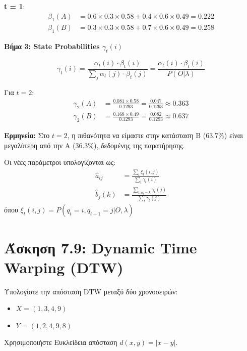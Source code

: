 \textbf{t = 1}:
\begin{align*}
\beta_1(A) &= 0.6 \times 0.3 \times 0.58 + 0.4 \times 0.6 \times 0.49 = 0.222 \\
\beta_1(B) &= 0.3 \times 0.3 \times 0.58 + 0.7 \times 0.6 \times 0.49 = 0.258
\end{align*}

\textbf{Βήμα 3: State Probabilities $\gamma_t(i)$}

$$\gamma_t(i) = \frac{\alpha_t(i) \cdot \beta_t(i)}{\sum_j \alpha_t(j) \cdot \beta_t(j)} = \frac{\alpha_t(i) \cdot \beta_t(i)}{P(O|\lambda)}$$

Για $t = 2$:
\begin{align*}
\gamma_2(A) &= \frac{0.081 \times 0.58}{0.1293} = \frac{0.047}{0.1293} \approx 0.363 \\
\gamma_2(B) &= \frac{0.168 \times 0.49}{0.1293} = \frac{0.082}{0.1293} \approx 0.637
\end{align*}

\textbf{Ερμηνεία:} Στο $t=2$, η πιθανότητα να είμαστε στην κατάσταση B (63.7\%) είναι
μεγαλύτερη από την A (36.3\%), δεδομένης της παρατήρησης.

\begin{warningbox}
Οι νέες παράμετροι υπολογίζονται ως:
\begin{align*}
\hat{a}_{ij} &= \frac{\sum_t \xi_t(i,j)}{\sum_t \gamma_t(i)} \\
\hat{b}_j(k) &= \frac{\sum_{t: o_t = k} \gamma_t(j)}{\sum_t \gamma_t(j)}
\end{align*}
όπου $\xi_t(i,j) = P(q_t=i, q_{t+1}=j | O, \lambda)$
\end{warningbox}

\section{Άσκηση 7.9: Dynamic Time Warping (DTW)}

\begin{formulabox}[Εκφώνηση]
Υπολογίστε την απόσταση DTW μεταξύ δύο χρονοσειρών:
\begin{itemize}
    \item $X = (1, 3, 4, 9)$
    \item $Y = (1, 2, 4, 9, 8)$
\end{itemize}

Χρησιμοποιήστε Ευκλείδεια απόσταση $d(x, y) = |x - y|$.
\end{formulabox}

